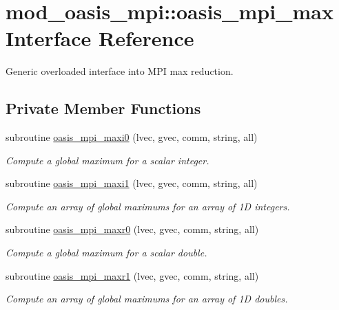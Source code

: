 \hypertarget{interfacemod__oasis__mpi_1_1oasis__mpi__max}{\section{mod\+\_\+oasis\+\_\+mpi\+:\+:oasis\+\_\+mpi\+\_\+max Interface Reference}
\label{interfacemod__oasis__mpi_1_1oasis__mpi__max}
}


Generic overloaded interface into M\+P\+I max reduction.  


\subsection*{Private Member Functions}
\begin{DoxyCompactItemize}
\item 
subroutine \hyperlink{interfacemod__oasis__mpi_1_1oasis__mpi__max_a713608b4fe433467df0eaa3bdf84ec11}{oasis\+\_\+mpi\+\_\+maxi0} (lvec, gvec, comm, string, all)
\begin{DoxyCompactList}\small\item\em Compute a global maximum for a scalar integer. \end{DoxyCompactList}\item 
subroutine \hyperlink{interfacemod__oasis__mpi_1_1oasis__mpi__max_a3b47b877c66859e93a366d76769e7c16}{oasis\+\_\+mpi\+\_\+maxi1} (lvec, gvec, comm, string, all)
\begin{DoxyCompactList}\small\item\em Compute an array of global maximums for an array of 1\+D integers. \end{DoxyCompactList}\item 
subroutine \hyperlink{interfacemod__oasis__mpi_1_1oasis__mpi__max_abe9d60c763e34813e83ad556b5ae679a}{oasis\+\_\+mpi\+\_\+maxr0} (lvec, gvec, comm, string, all)
\begin{DoxyCompactList}\small\item\em Compute a global maximum for a scalar double. \end{DoxyCompactList}\item 
subroutine \hyperlink{interfacemod__oasis__mpi_1_1oasis__mpi__max_a4bd1cea5e9e55f3795538b1a44bdb6e4}{oasis\+\_\+mpi\+\_\+maxr1} (lvec, gvec, comm, string, all)
\begin{DoxyCompactList}\small\item\em Compute an array of global maximums for an array of 1\+D doubles. \end{DoxyCompactList}\end{DoxyCompactItemize}


